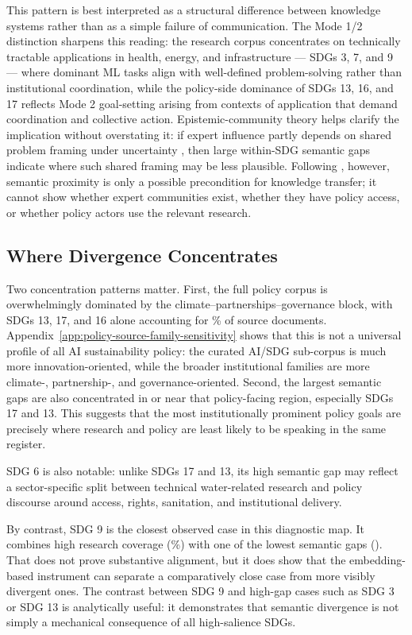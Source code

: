 \documentclass[12pt,a4paper]{article}
\begin{document}
This pattern is best interpreted as a structural difference between knowledge systems rather than as a simple failure of communication. The Mode 1/2 distinction \parencite{Gibbons1994} sharpens this reading: the research corpus concentrates on technically tractable applications in health, energy, and infrastructure --- SDGs 3, 7, and 9 --- where dominant ML tasks align with well-defined problem-solving rather than institutional coordination, while the policy-side dominance of SDGs 13, 16, and 17 reflects Mode 2 goal-setting arising from contexts of application that demand coordination and collective action. Epistemic-community theory helps clarify the implication without overstating it: if expert influence partly depends on shared problem framing under uncertainty \parencite{Haas1992}, then large within-SDG semantic gaps indicate where such shared framing may be less plausible. Following \textcite{Cross2013}, however, semantic proximity is only a possible precondition for knowledge transfer; it cannot show whether expert communities exist, whether they have policy access, or whether policy actors use the relevant research.

\subsection{Where Divergence Concentrates}

Two concentration patterns matter. First, the full policy corpus is overwhelmingly dominated by the climate--partnerships--governance block, with SDGs 13, 17, and 16 alone accounting for \PolicyTopThreePct\% of source documents. Appendix~\ref{app:policy-source-family-sensitivity} shows that this is not a universal profile of all AI sustainability policy: the curated AI/SDG sub-corpus is much more innovation-oriented, while the broader institutional families are more climate-, partnership-, and governance-oriented. Second, the largest semantic gaps are also concentrated in or near that policy-facing region, especially SDGs 17 and 13. This suggests that the most institutionally prominent policy goals are precisely where research and policy are least likely to be speaking in the same register.

SDG 6 is also notable: unlike SDGs 17 and 13, its high semantic gap may reflect a sector-specific split between technical water-related research and policy discourse around access, rights, sanitation, and institutional delivery.

By contrast, SDG 9 is the closest observed case in this diagnostic map. It combines high research coverage (\ResearchPctSdgNine\%) with one of the lowest semantic gaps (\SemanticGapSdgNine). That does not prove substantive alignment, but it does show that the embedding-based instrument can separate a comparatively close case from more visibly divergent ones. The contrast between SDG 9 and high-gap cases such as SDG 3 or SDG 13 is analytically useful: it demonstrates that semantic divergence is not simply a mechanical consequence of all high-salience SDGs.
\end{document}
